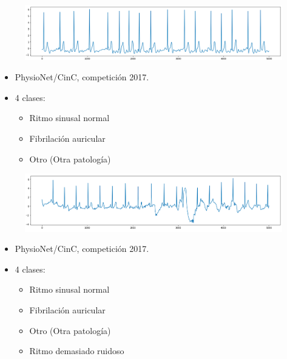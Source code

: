 \begin{frame}
\begin{overprint}
        \begin{figure}
            \centering
            \includegraphics[keepaspectratio=true,height=0.25\paperheight]{Images/FA.png}
        \end{figure}
    
        \begin{itemize}
            \item PhysioNet/CinC, competición 2017.
            \item 4 clases: 
                \begin{itemize}
                    \item Ritmo sinusal normal
                    \item Fibrilación auricular
                    \item Otro (Otra patología)
                \end{itemize}
        \end{itemize}
        
        \begin{figure}
            \centering
            \includegraphics[keepaspectratio=true,height=0.25\paperheight]{Images/Other.png}
        \end{figure}
        
        
        \begin{itemize}
            \item PhysioNet/CinC, competición 2017.
            \item 4 clases: 
                \begin{itemize}
                    \item Ritmo sinusal normal
                    \item Fibrilación auricular
                    \item Otro (Otra patología)
                    \item Ritmo demasiado ruidoso
                \end{itemize}
        \end{itemize}
        

\end{overprint}
\end{frame}
